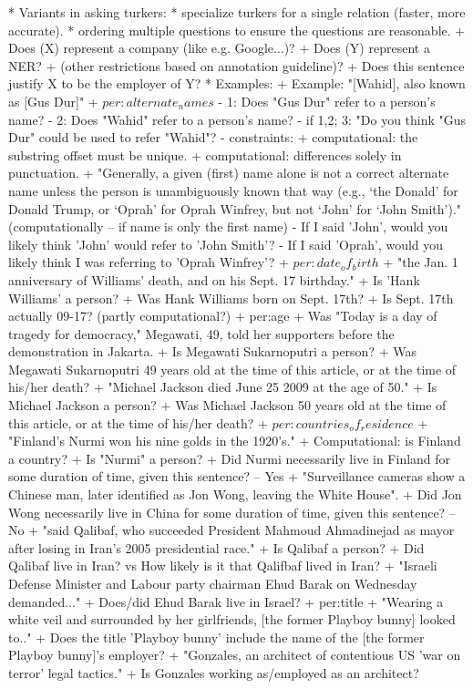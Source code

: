 * Variants in asking turkers:
  * specialize turkers for a single relation (faster, more accurate).
  * ordering multiple questions to ensure the questions are reasonable.
      + Does (X) represent a company (like e.g. Google...)?
      + Does (Y) represent a NER?
      + (other restrictions based on annotation guideline)?
      + Does this sentence justify X to be the employer of Y? 
* Examples:
  + Example: "[Wahid], also known as [Gus Dur]"
  + $per:alternate_names$
    - 1: Does "Gus Dur" refer to a person's name?
    - 2: Does "Wahid" refer to a person's name?
    - if 1,2; 3: "Do you think "Gus Dur" could be used to refer "Wahid"?
    - constraints:
      + computational: the substring offset must be unique.
      + computational: differences solely in punctuation. 
      + "Generally, a given (first) name alone is not a correct alternate name unless the person is unambiguously known that way (e.g., ‘the Donald’ for Donald Trump, or ‘Oprah’ for Oprah Winfrey, but not ‘John’ for ‘John Smith’)."
        (computationally -- if name is only the first name)
        - If I said 'John', would you likely think 'John' would refer to 'John Smith'?
        - If I said 'Oprah', would you likely think I was referring to 'Oprah Winfrey'?
  + $per:date_of_birth$
    + "the Jan. 1 anniversary of Williams' death, and on his Sept. 17 birthday."
    + Is 'Hank Williams' a person?
    + Was Hank Williams born on Sept. 17th?
    + Is Sept. 17th actually 09-17? (partly computational?)
  + per:age
    + Was "Today is a day of tragedy for democracy," Megawati, 49, told 
    her supporters before the demonstration in Jakarta.
    + Is Megawati Sukarnoputri a person? 
    + Was Megawati Sukarnoputri 49 years old at the time of this article, or at the time of his/her death?
    + "Michael Jackson died June 25 2009 at the age of 50."
    + Is Michael Jackson a person?
    + Was Michael Jackson 50 years old at the time of this article, or at the time of his/her death?
  + $per:countries_of_residence$
    + "Finland's Nurmi won his nine golds in the 1920's."
    + Computational: is Finland a country?
    + Is "Nurmi" a person?
    + Did Nurmi necessarily live in Finland for some duration of time, given this sentence? -- Yes
    + "Surveillance cameras show a Chinese man, later identified as Jon Wong, leaving the White House".
    + Did Jon Wong necessarily live in China for some duration of time, given this sentence? -- No
    + "said Qalibaf, who succeeded President Mahmoud Ahmadinejad as mayor after losing in Iran's 2005 presidential 
race." 
    + Is Qalibaf a person?
    + Did Qalibaf live in Iran? vs How likely is it that Qalifbaf lived in Iran?
    + "Israeli Defense Minister and Labour party chairman Ehud 
    Barak on Wednesday demanded..."
    + Does/did Ehud Barak live in Israel?
  + per:title
    + "Wearing a white veil and surrounded by her girlfriends, [the former Playboy bunny] looked to.."
    + Does the title 'Playboy bunny' include the name of the [the former Playboy bunny]'s employer?
    + "Gonzales, an architect of contentious US 'war on terror' legal tactics."
    + Is Gonzales working as/employed as an architect?

